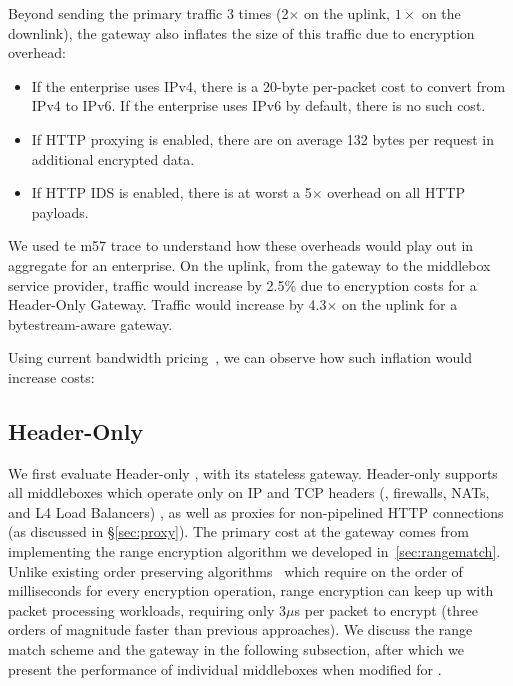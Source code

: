 Beyond sending the primary traffic 3 times (2$\times$ on the uplink, $1\times$ on the downlink), the gateway also inflates the size of this traffic due to encryption overhead:
\begin{itemize}
  \item If the enterprise uses IPv4, there is a 20-byte per-packet cost to convert from IPv4 to IPv6. If the enterprise uses IPv6 by default, there is no such cost.
  \item If HTTP proxying is enabled, there are on average 132 bytes per request in additional encrypted data.
  \item If HTTP IDS is enabled, there is at worst a 5$\times$ overhead on all HTTP payloads.
\end{itemize}
We used te m57 trace to understand how these overheads would play out in aggregate for an enterprise.
On the uplink, from the gateway to the middlebox service provider, traffic would increase by 2.5\% due to encryption costs for a Header-Only Gateway. Traffic would increase by 4.3$\times$ on the uplink for a bytestream-aware gateway. 

Using current bandwidth pricing~\cite{comcast-costs, megapath-costs, verizon-costs}, we can observe how such inflation would increase costs: 

\subsection{Header-Only \sys}
We first evaluate Header-only \sys, with its stateless gateway. 
Header-only \sys supports all middleboxes which operate only on IP and TCP headers (\eg{}, firewalls, NATs, and L4 Load Balancers) , as well as proxies for non-pipelined HTTP connections (as discussed in \S\ref{sec:proxy}).
The primary cost at the gateway comes from implementing the range encryption algorithm we developed in~\ref{sec:rangematch}. 
Unlike existing order preserving algorithms~\cite{mope,BCLO} which require on the order of milliseconds for every encryption operation, range encryption can keep up with packet processing workloads, requiring only 3$\mu$s per packet to encrypt (three orders of magnitude faster than previous approaches).
We discuss the range match scheme and the gateway in the following subsection, after which we present the performance of individual middleboxes when modified for \sys.

